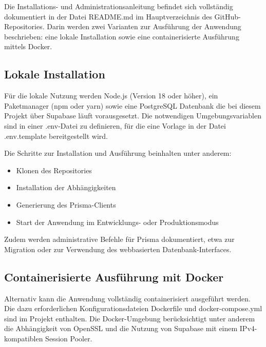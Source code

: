 \documentclass[a4paper,12pt]{article}
\begin{document}
Die Installations- und Administrationsanleitung befindet sich vollständig dokumentiert in der Datei README.md im Hauptverzeichnis des GitHub-Repositories. Darin werden zwei Varianten zur Ausführung der Anwendung beschrieben: eine lokale Installation sowie eine containerisierte Ausführung mittels Docker.


\subsection{Lokale Installation}

Für die lokale Nutzung werden Node.js (Version 18 oder höher), ein Paketmanager (npm oder yarn) sowie eine PostgreSQL Datenbank die bei diesem Projekt über Supabase läuft vorausgesetzt. Die notwendigen Umgebungsvariablen sind in einer .env-Datei zu definieren, für die eine Vorlage in der Datei .env.template bereitgestellt wird.

Die Schritte zur Installation und Ausführung beinhalten unter anderem:

\begin{itemize}
  \item Klonen des Repositories
  \item Installation der Abhängigkeiten
  \item Generierung des Prisma-Clients
  \item Start der Anwendung im Entwicklungs- oder Produktionsmodus
\end{itemize}

Zudem werden administrative Befehle für Prisma dokumentiert, etwa zur Migration oder zur Verwendung des webbasierten Datenbank-Interfaces.


\subsection{Containerisierte Ausführung mit Docker}

Alternativ kann die Anwendung vollständig containerisiert ausgeführt werden. Die dazu erforderlichen Konfigurationsdateien Dockerfile und docker-compose.yml sind im Projekt enthalten. Die Docker-Umgebung berücksichtigt unter anderem die Abhängigkeit von OpenSSL und die Nutzung von Supabase mit einem IPv4-kompatiblen Session Pooler.
\end{document}
